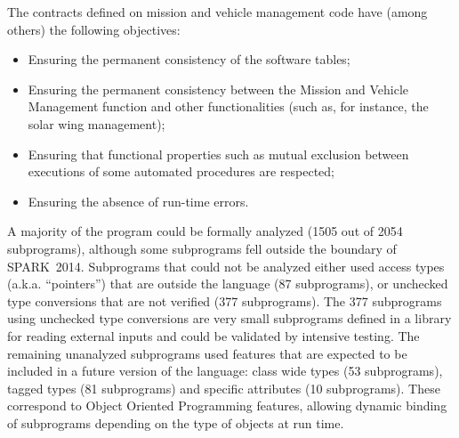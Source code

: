 \documentclass[10pt,a4paper,twocolumn]{article}
\newcommand{\newspark}{SPARK~2014\xspace}
\newcommand{\aka}{a.k.a.\xspace}
\begin{document}
The contracts defined on mission and vehicle management code have (among others)
the following objectives:

\begin{itemize}
\item Ensuring the permanent consistency of the software tables;
\item Ensuring the permanent consistency between the Mission and Vehicle Management function and other functionalities (such as, for instance, the solar wing management);
\item Ensuring that functional properties such as mutual exclusion between executions of some automated procedures are respected;
\item Ensuring the absence of run-time errors.
\end{itemize}


A majority of the program could be formally analyzed (1505 out of 2054
subprograms), although some subprograms fell outside the boundary of \newspark.
Subprograms that could not be analyzed either used access types (\aka
``pointers'') that are outside the language (87 subprograms), or unchecked type
conversions that are not verified (377 subprograms).  The 377 subprograms using
unchecked type conversions are very small subprograms defined in a library for
reading external inputs and could be validated by intensive testing. The
remaining unanalyzed subprograms used features that are expected to be included
in a future version of the language: class wide types (53 subprograms), tagged
types (81 subprograms) and specific attributes (10 subprograms). These
correspond to Object Oriented Programming features, allowing dynamic binding of
subprograms depending on the type of objects at run time.

\end{document}
